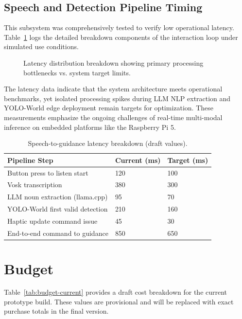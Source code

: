 \documentclass{article}
\begin{document}
\subsection{Speech and Detection Pipeline Timing}

This subsystem was comprehensively tested to verify low operational latency. Table~\ref{tab:pipeline-latency} logs the detailed breakdown components of the interaction loop under simulated use conditions.

\begin{figure}[h]
    \centering
    \vspace{2cm} %
    \caption{Latency distribution breakdown showing primary processing bottlenecks vs. system target limits.}
    \label{fig:latency-distribution}
\end{figure}

The latency data indicate that the system architecture meets operational benchmarks, yet isolated processing spikes during LLM NLP extraction and YOLO-World edge deployment remain targets for optimization. These measurements emphasize the ongoing challenges of real-time multi-modal inference on embedded platforms like the Raspberry Pi 5.

\begin{table}[h]
\centering
\small
\setlength{\tabcolsep}{3pt}
\renewcommand{\arraystretch}{1.2}
\begin{tabular}{p{}p{}p{}}
\hline
\textbf{Pipeline Step} & \textbf{Current (ms)} & \textbf{Target (ms)} \\
\hline
Button press to listen start & 120 & 100 \\
Vosk transcription & 380 & 300 \\
LLM noun extraction (llama.cpp) & 95 & 70 \\
YOLO-World first valid detection & 210 & 160 \\
Haptic update command issue & 45 & 30 \\
End-to-end command to guidance & 850 & 650 \\
\hline
\end{tabular}
\caption{Speech-to-guidance latency breakdown (draft values).}
\label{tab:pipeline-latency}
\end{table}

\section{Budget}
Table~\ref{tab:budget-current} provides a draft cost breakdown for the current prototype build. These values are provisional and will be replaced with exact purchase totals in the final version.
\end{document}
